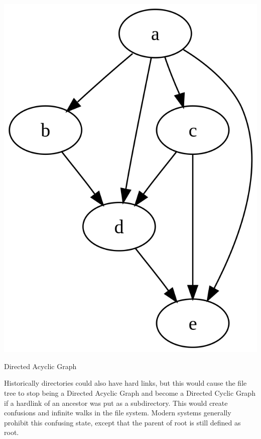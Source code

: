 \begin{marginfigure}
  \includegraphics{images/png/dag.png}
  \caption[Directed Acyclic Graph]{Directed Acyclic Graph}
\end{marginfigure}

Historically directories could also have hard links, but this would cause the file tree to stop being a Directed Acyclic Graph
and become a Directed Cyclic Graph if a hardlink of an ancestor was put as a subdirectory.
This would create confusions and infinite walks in the file system.
Modern systems generally prohibit this confusing state, except that the parent of root is still defined as root.


